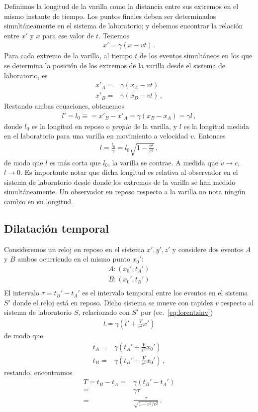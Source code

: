 Definimos la longitud de la varilla como la distancia entre sus extremos en el mismo instante de tiempo. Los puntos finales deben ser determinados simultáneamente en el sistema de laboratorio; y debemos encontrar la relación entre $x'$ y $x$ para ese valor de $t$. Tenemos
\begin{align*}
  x'=\gamma(x-vt)\,.
\end{align*}
Para cada extremo de la varilla, al tiempo $t$ de los eventos simultáneos en los que se determina la posición de los extremos de la varilla desde el sistema de laboratorio, es
\begin{align*}
  x'_A=&\gamma(x_A-vt)\nonumber\\
  x'_B=&\gamma(x_B-vt)\,,
\end{align*}
Restando ambas ecuaciones, obtenemos
\begin{align*}
  l'=l_0\equiv=x'_B-x'_A=\gamma(x_B-x_A)=\gamma l\,,
\end{align*}
donde $l_0$ es la longitud en reposo o \emph{propia} de la varilla, y $l$ es la longitud medida en el laboratorio para una varilla en movimiento a velocidad $v$. Entonces
\begin{align*}
  l=\frac{l_0}{\gamma}=l_0\sqrt{1-\frac{v^2}{c^2}}\,,
\end{align*}
de modo que $l$ es más corta que $l_0$, la varilla se contrae. A medida que $v\to c$, $l\to 0$. Es importante notar que dicha longitud es relativa al observador en el sistema de laboratorio desde donde los extremos de la varilla se han medido simultáneamente. Un observador en reposo respecto a la varilla no nota ningún cambio en su longitud.
\subsection{Dilatación temporal}
Consideremos un reloj en reposo en el sistema $x',y',z'$ y considere dos eventos $A$ y $B$ ambos ocurriendo en el mismo punto $x_0'$:
\begin{align*}
  A:(x_0',t_A')\nonumber\\
  B:(x_0',t_B')\nonumber\\
\end{align*}
El intervalo $\tau=t_B'-t_A'$ es el intervalo temporal entre los eventos en el sistema $S'$ donde el reloj está en reposo. Dicho sistema se mueve con rapidez $v$ respecto al sistema de laboratorio $S$, relacionado con $S'$ por (ec.~\eqref{eq:lorentzinv})
\begin{align*}
  t=\gamma\left(t'+\frac{V}{c^2}x'\right)
\end{align*}
de modo que
\begin{align*}
   t_A=&\gamma\left(t_A'+\frac{V}{c^2}x_0'\right)\nonumber\\
   t_B=&\gamma\left(t_B'+\frac{V}{c^2}x_0'\right)\,,
\end{align*}
restando, encontramos
\begin{align*}
  T=t_B-t_A=&\gamma(t_B'-t_A')\nonumber\\
  =&\gamma\tau\nonumber\\
  =&\frac{\tau}{\sqrt{1-v^2/c^2}}\,.
\end{align*}

